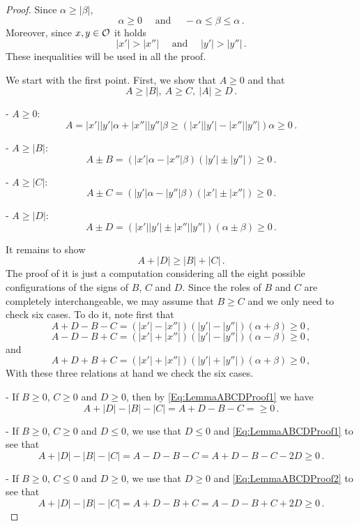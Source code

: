 \begin{proof}
Since $\alpha \geq |\beta |$, 
$$
\alpha\geq 0 \quad \textrm{ and } \quad  -\alpha \leq \beta \leq \alpha\,.
$$
Moreover, since $x,y\in\mathcal{O}$ it holds
$$
|x'|>|x''| \quad \textrm{ and } \quad |y'|>|y''|\,.
$$
These inequalities will be used in all the proof.

We start with the first point. First,  we show that $A\geq 0$ and that 
$$
A \geq |B|, \ A \geq C ,\ |A| \geq D\,.
$$


- $A \geq 0$:
$$
 A =  |x'||y'|  \alpha + |x''||y''|\beta \geq (|x'||y'|  - |x''||y''|)\alpha \geq 0\,.
$$

- $A \geq |B|$:
$$
A\pm B = (|x'|\alpha-|x''|\beta)(|y'|\pm |y''|) \geq 0\,.
$$

- $A \geq |C|$:
$$
A\pm C = (|y'|\alpha-|y''|\beta)(|x'|\pm |x''|)  \geq 0\,.
$$

- $A \geq |D|$:
$$
A\pm D = (|x'||y'| \pm |x''||y''|)(\alpha \pm \beta) \geq 0\,.
$$


It remains to show
$$
A + |D| \geq |B| + |C|\,.
$$
The proof of it is just a computation considering all the eight possible configurations of the signs of $B$, $C$ and $D$. Since the roles of $B$ and $C$ are completely interchangeable, we may assume that $B \geq C$ and we only need to check six cases. To do it, note first that
\begin{equation}
\label{Eq:LemmaABCDProof1}
A + D - B - C = (|x'|-|x''|)(|y'|-|y''|)(\alpha + \beta) \geq 0 \,,
\end{equation}
\begin{equation}
\label{Eq:LemmaABCDProof2}
A - D - B + C = (|x'|+|x''|)(|y'|-|y''|)(\alpha - \beta) \geq 0 \,,
\end{equation}
and
\begin{equation}
\label{Eq:LemmaABCDProof3}
A + D + B + C = (|x'|+|x''|)(|y'|+|y''|)(\alpha + \beta) \geq 0 \,,
\end{equation}
With these three relations at hand we check the six cases.

- If $B \geq 0$, $C \geq 0$ and $D \geq 0$, then by \eqref{Eq:LemmaABCDProof1} we have
$$
A + |D| - |B| - |C| = A + D - B - C = \geq 0\,.
$$

- If $B \geq 0$, $C \geq 0$ and $D \leq 0$, we use that $D\leq 0$ and \eqref{Eq:LemmaABCDProof1} to see that
$$
A + |D| - |B| - |C| = A - D - B - C =  A + D - B - C -2D \geq 0\,.
$$

- If $B \geq 0$, $C \leq 0$ and $D \geq 0$, we use that $D\geq 0$ and \eqref{Eq:LemmaABCDProof2} to see that
$$
A + |D| - |B| - |C| = A + D - B + C =  A - D - B + C +2D \geq 0\,.
$$


\end{proof}
